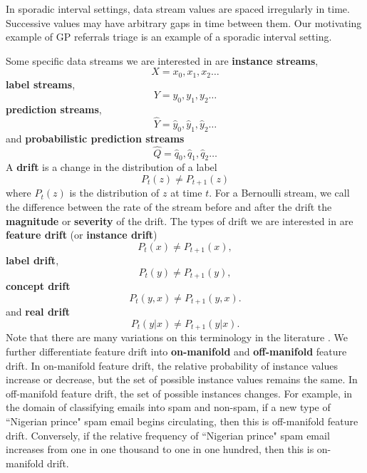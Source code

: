 In sporadic interval settings, data stream values are spaced irregularly in time.  Successive values may have arbitrary gaps in time between them.  Our motivating example of GP referrals triage is an example of a sporadic interval setting.

Some specific data streams we are interested in are {\bf instance streams},
\begin{equation}
    X = x_0,x_1,x_2\dots
\end{equation}
{\bf label streams},
\begin{equation}
    Y = y_0,y_1,y_2\dots
\end{equation}
{\bf prediction streams},
\begin{equation}
    \hat{Y} = \hat{y}_0,\hat{y}_1,\hat{y}_2\dots
\end{equation}
and {\bf probabilistic prediction streams}
\begin{equation}
    \hat{Q} = \hat{q}_0,\hat{q}_1,\hat{q}_2\dots
\end{equation}
A {\bf drift} is a change in the distribution of a label
\begin{equation}
    P_t(z) \ne P_{t+1}(z)
\end{equation}
where $P_t(z)$ is the distribution of $z$ at time $t$. For a Bernoulli stream, we call the difference between the rate of the stream before and after the drift the {\bf magnitude} or {\bf severity} of the drift. The types of drift we are interested in are {\bf feature drift} (or {\bf instance drift})
\begin{equation}
    P_t(x) \ne P_{t+1}(x),
\end{equation}
{\bf label drift},
\begin{equation}
    P_t(y) \ne P_{t+1}(y),
\end{equation}
{\bf concept drift}
\begin{equation}
    P_t(y,x) \ne P_{t+1}(y,x).
\end{equation}
and {\bf real drift}
\begin{equation}
    P_t(y|x) \ne P_{t+1}(y|x).
\end{equation}
Note that there are many variations on this terminology in the literature \cite{dataset_drift}\cite{characterizing_drift}. We further differentiate feature drift into {\bf on-manifold} and {\bf off-manifold} feature drift. In on-manifold feature drift, the relative probability of instance values increase or decrease, but the set of possible instance values remains the same. In off-manifold feature drift, the set of possible instances changes. For example, in the domain of classifying emails into spam and non-spam, if a new type of ``Nigerian prince" spam email begins circulating, then this is off-manifold feature drift. Conversely, if the relative frequency of ``Nigerian prince" spam email increases from one in one thousand to one in one hundred, then this is on-manifold drift. 

